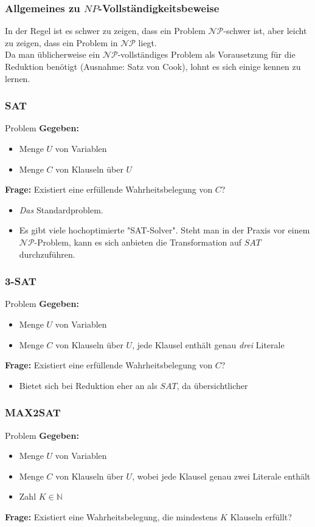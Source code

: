 \documentclass{beamer}
\begin{document}
\begin{frame}
\frametitle{Allgemeines zu $NP$-Vollständigkeitsbeweise}
In der Regel ist es schwer zu zeigen, dass ein Problem $\mathcal{NP}$-schwer ist, aber leicht zu zeigen, dass ein Problem in $\mathcal{NP}$ liegt.\\[8pt]
Da man üblicherweise ein $\mathcal{NP}$-vollständiges Problem als Vorausetzung für die Reduktion benötigt (Ausnahme: Satz von Cook), lohnt es sich einige kennen zu lernen.
\end{frame}

\begin{frame}
\frametitle{SAT}
\begin{block}{Problem}
\textbf{Gegeben:}
\begin{itemize}
 \item Menge $U$ von Variablen
 \item Menge $C$ von Klauseln über $U$
\end{itemize}
\textbf{Frage:} Existiert eine erfüllende Wahrheitsbelegung von $C$?
\end{block}
\begin{itemize}
\item \emph{Das} Standardproblem.
\item Es gibt viele hochoptimierte "SAT-Solver". Steht man in der Praxis vor einem $\mathcal{NP}$-Problem, kann es sich anbieten die Transformation auf $SAT$ durchzuführen.
\end{itemize}
\end{frame}
\begin{frame}
\frametitle{3-SAT}
\begin{block}{Problem}
\textbf{Gegeben:}
\begin{itemize}
 \item Menge $U$ von Variablen
 \item Menge $C$ von Klauseln über $U$, jede Klausel enthält genau \emph{drei} Literale
\end{itemize}
\textbf{Frage:} Existiert eine erfüllende Wahrheitsbelegung von $C$?
\end{block}
\begin{itemize}
\item Bietet sich bei Reduktion eher an als $SAT$, da übersichtlicher
\end{itemize}
\end{frame}
\begin{frame}
\frametitle{MAX2SAT}
\begin{block}{Problem}
\textbf{Gegeben:}
\begin{itemize}
 \item Menge $U$ von Variablen
 \item Menge $C$ von Klauseln über $U$, wobei jede Klausel genau zwei Literale enthält
 \item Zahl $K \in \mathbb{N}$
\end{itemize}
\textbf{Frage:} Existiert eine Wahrheitsbelegung, die mindestens $K$ Klauseln erfüllt?
\end{block}
\end{frame}
\end{document}
